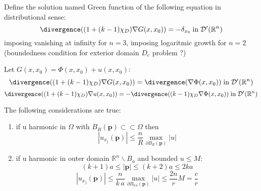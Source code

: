 \begin{definition}
 Define the solution named Green function of the following equation in distributional sense:
 \begin{equation}
  \divergence((1+(k-1)\chi_D)\nabla G(x,x_0)) = - \delta_{x_0}\;\textup{in}\;\mathcal{D}'(\mathbb{R}^n)
 \end{equation}
 imposing vanishing at infinity for $n=3$, imposing logaritmic growth for $n=2$ (boundedness condition for exterior domain $D_e$ problem ?)
\end{definition}
Let $G(x,x_0)=\Phi(x,x_0)+u(x,x_0)$:
\begin{equation*}
  \divergence((1+(k-1)\chi_D)\nabla G(x,x_0)) = \divergence(\nabla \Phi(x,x_0)) \;\textup{in}\;\mathcal{D}'(\mathbb{R}^n)
\end{equation*}
\begin{equation}
  \divergence((1+(k-1)\chi_D)\nabla u(x,x_0)) = -\divergence((k-1)\chi_D \nabla \Phi(x,x_0)) \;\textup{in}\;\mathcal{D}'(\mathbb{R}^n)
\end{equation}

\begin{lemma}
 The following considerations are true:
 \begin{enumerate}
  \item if u harmonic in $\Omega$ with $B_R(\mathbf{p})\subset\subset\Omega$ then
   \begin{equation}
    |u_{x_j}(\mathbf{p})|\leq\frac{n}{R}\max_{\partial B_R(\mathbf{p})}|u|
   \end{equation}
  \item if u harmonic in outer domain $\mathbb{R}^n\backslash B_a $ and bounded $u\leq M$:
   \[(k+1)a\leq |\mathbf{p}| \leq (k+2)a \leq 2ka \]
   \begin{equation}
    |u_{x_j}(\mathbf{p})|\leq\frac{n}{k\,a}\max_{\partial B_{k\,a}(\mathbf{p})}|u|\leq\frac{2n}{r}M = \frac{c}{r}
   \end{equation}

 \end{enumerate}
\end{lemma}
\fi

